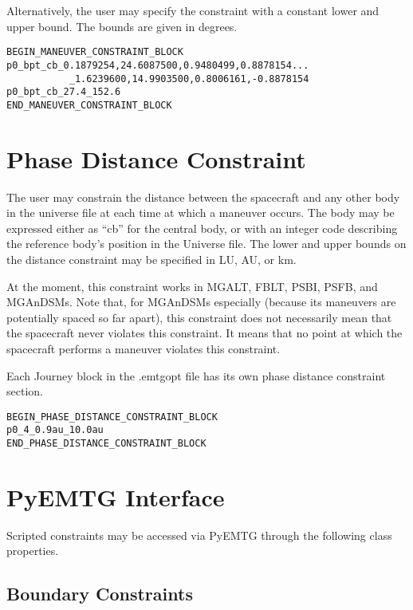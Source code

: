 \documentclass[11pt]{article}
\begin{document}
Alternatively, the user may specify the constraint with a constant lower and upper bound. The bounds are given in degrees.

\begin{verbatim}
BEGIN_MANEUVER_CONSTRAINT_BLOCK
p0_bpt_cb_0.1879254,24.6087500,0.9480499,0.8878154...
           _1.6239600,14.9903500,0.8006161,-0.8878154
p0_bpt_cb_27.4_152.6
END_MANEUVER_CONSTRAINT_BLOCK
\end{verbatim}


\section{Phase Distance Constraint}
\label{sec:PhaseDistanceConstraint}

The user may constrain the distance between the spacecraft and any other body in the universe file at each time at which a maneuver occurs. The body may be expressed either as ``cb'' for the central body, or with an integer code describing the reference body's position in the Universe file. The lower and upper bounds on the distance constraint may be specified in LU, AU, or km.

At the moment, this constraint works in \ac{MGALT}, \ac{FBLT}, \ac{PSBI}, \ac{PSFB}, and \ac{MGAnDSMs}. Note that, for \ac{MGAnDSMs} especially (because its maneuvers are potentially spaced so far apart), this constraint does not necessarily mean that the spacecraft never violates this constraint. It means that no point at which the spacecraft performs a maneuver violates this constraint.

Each Journey block in the .emtgopt file has its own phase distance constraint section.

\begin{verbatim}
BEGIN_PHASE_DISTANCE_CONSTRAINT_BLOCK
p0_4_0.9au_10.0au
END_PHASE_DISTANCE_CONSTRAINT_BLOCK
\end{verbatim}

\section{PyEMTG Interface}
\label{sec:PyemtgInterface}

Scripted constraints may be accessed via PyEMTG through the following class properties.

\subsection{Boundary Constraints}
\label{sec:PyemtgBoundaryConstraints}
\end{document}
